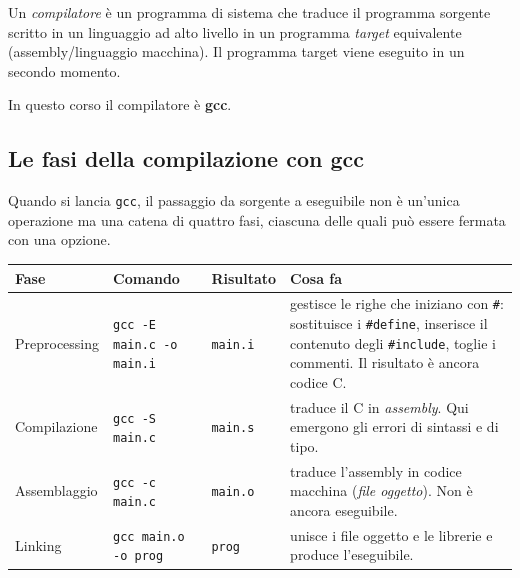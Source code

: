 \documentclass[11pt,a4paper]{article}
\begin{document}
\begin{definizione}
Un \emph{compilatore} è un programma di sistema che traduce il programma
sorgente scritto in un linguaggio ad alto livello in un programma
\emph{target} equivalente (assembly/linguaggio macchina). Il programma target
viene eseguito in un secondo momento.
\end{definizione}

In questo corso il compilatore è \textbf{gcc}.

\begin{center}
\end{center}

\subsection{Le fasi della compilazione con gcc}

Quando si lancia \lstinline|gcc|, il passaggio da sorgente a eseguibile non è
un'unica operazione ma una catena di quattro fasi, ciascuna delle quali può
essere fermata con una opzione.

\begin{center}
\small
\renewcommand{\arraystretch}{1.25}
\begin{tabular}{@{}l l l p{5.6cm}@{}}
\toprule
\textbf{Fase} & \textbf{Comando} & \textbf{Risultato} & \textbf{Cosa fa} \\
\midrule
Preprocessing & \lstinline|gcc -E main.c -o main.i| & \texttt{main.i} &
  gestisce le righe che iniziano con \lstinline|#|: sostituisce i
  \lstinline|#define|, inserisce il contenuto degli \lstinline|#include|,
  toglie i commenti. Il risultato è ancora codice C. \\
Compilazione & \lstinline|gcc -S main.c| & \texttt{main.s} &
  traduce il C in \emph{assembly}. Qui emergono gli errori di sintassi e di
  tipo. \\
Assemblaggio & \lstinline|gcc -c main.c| & \texttt{main.o} &
  traduce l'assembly in codice macchina (\emph{file oggetto}). Non è ancora
  eseguibile. \\
Linking & \lstinline|gcc main.o -o prog| & \texttt{prog} &
  unisce i file oggetto e le librerie e produce l'eseguibile. \\
\bottomrule
\end{tabular}
\end{center}
\end{document}
